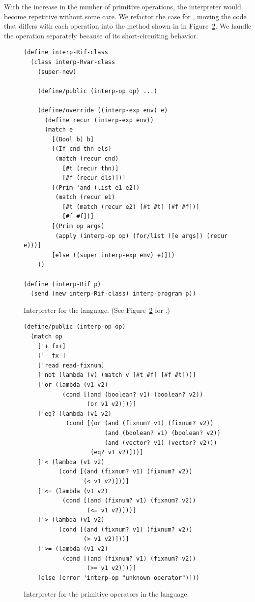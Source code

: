 \documentclass[11pt]{book}
\begin{document}
{With the increase in the number of primitive operations, the
interpreter would become repetitive without some care.  We refactor
the case for , moving the code that differs with each
operation into the  method shown in in
Figure~\ref{fig:interp-op-Rif}. We handle the  operation
separately because of its short-circuiting behavior.

\begin{figure}[tbp]
\begin{lstlisting}
(define interp-Rif-class
  (class interp-Rvar-class
    (super-new)

    (define/public (interp-op op) ...)

    (define/override ((interp-exp env) e)
      (define recur (interp-exp env))
      (match e
        [(Bool b) b]
        [(If cnd thn els)
         (match (recur cnd)
           [#t (recur thn)]
           [#f (recur els)])]
        [(Prim 'and (list e1 e2))
         (match (recur e1)
           [#t (match (recur e2) [#t #t] [#f #f])]
           [#f #f])]
        [(Prim op args)
         (apply (interp-op op) (for/list ([e args]) (recur e)))]
        [else ((super interp-exp env) e)]))
    ))

(define (interp-Rif p)
  (send (new interp-Rif-class) interp-program p))
\end{lstlisting}
\caption{Interpreter for the \LangIf{} language. (See
  Figure~\ref{fig:interp-op-Rif} for .)}
\label{fig:interp-Rif}
\end{figure}

\begin{figure}[tbp]
\begin{lstlisting}
(define/public (interp-op op)
  (match op
    ['+ fx+]
    ['- fx-]
    ['read read-fixnum]
    ['not (lambda (v) (match v [#t #f] [#f #t]))]
    ['or (lambda (v1 v2)
           (cond [(and (boolean? v1) (boolean? v2))
                  (or v1 v2)]))]
    ['eq? (lambda (v1 v2)
            (cond [(or (and (fixnum? v1) (fixnum? v2))
                       (and (boolean? v1) (boolean? v2))
                       (and (vector? v1) (vector? v2)))
                   (eq? v1 v2)]))]
    ['< (lambda (v1 v2)
          (cond [(and (fixnum? v1) (fixnum? v2))
                 (< v1 v2)]))]
    ['<= (lambda (v1 v2)
           (cond [(and (fixnum? v1) (fixnum? v2))
                  (<= v1 v2)]))]
    ['> (lambda (v1 v2)
          (cond [(and (fixnum? v1) (fixnum? v2))
                 (> v1 v2)]))]
    ['>= (lambda (v1 v2)
           (cond [(and (fixnum? v1) (fixnum? v2))
                  (>= v1 v2)]))]
    [else (error 'interp-op "unknown operator")]))
\end{lstlisting}
\caption{Interpreter for the primitive operators in the \LangIf{} language.}
\label{fig:interp-op-Rif}
\end{figure}


}
\end{document}
